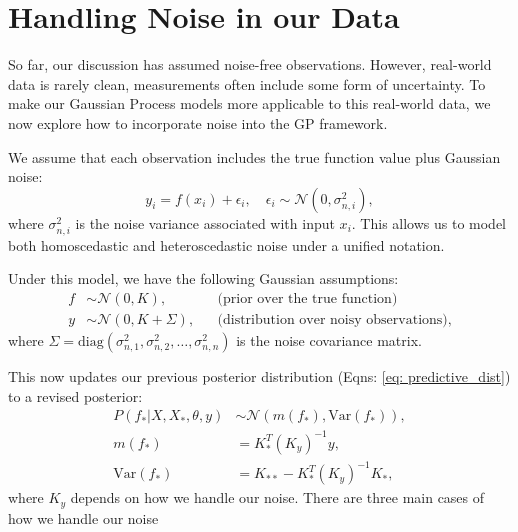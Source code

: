 \documentclass{ucdgradtaughtthesis}
\begin{document}
\section{Handling Noise in our Data}
\label{sec: Handlingnoise}

So far, our discussion has assumed noise-free observations. However, real-world data is rarely clean, measurements often include some form of uncertainty. To make our Gaussian Process models more applicable to this real-world data,
we now explore how to incorporate noise into the GP framework.

\bigskip

\noindent
We assume that each observation includes the true function value plus Gaussian noise:
\begin{equation}
y_i = f(x_i) + \epsilon_i, \quad \epsilon_i \sim \mathcal{N}(0, \sigma_{n,i}^2),
\end{equation}
where \( \sigma_{n,i}^2 \) is the noise variance associated with input \( x_i \). This allows us to model both homoscedastic and heteroscedastic noise under a unified notation.

\bigskip

\noindent
Under this model, we have the following Gaussian assumptions:
\begin{align}
f &\sim \mathcal{N}(0, K), &&\text{(prior over the true function)} \\
y &\sim \mathcal{N}(0, K + \Sigma), &&\text{(distribution over noisy observations)},
\label{eq: prior_distribution_noise}
\end{align}
where \( \Sigma = \mathrm{diag}(\sigma_{n,1}^2, \sigma_{n,2}^2, \dots, \sigma_{n,n}^2) \) is the noise covariance matrix.

\bigskip
\noindent
This now updates our previous posterior distribution (Eqns: \ref{eq: predictive_dist}) to a revised posterior:
%
%
\begin{subequations}
\begin{align}
    P(f_*|X,X_*,\theta,y) &\sim \mathcal{N}(m(f_*), \text{Var}(f_*)),\\
m(f_*) &= K_*^T (K_y)^{-1} y,
\label{eq: predictive_mean_noise}\\
\text{Var}(f_*) &= K_{**} - K_*^T (K_y)^{-1} K_*,
\label{eq: predictive_variance_noise}
\end{align}
\label{eq: predictive_distribution_noise}
\end{subequations}
%
%
where \(K_y\) depends on how we handle our noise. There are three main cases of how we handle our noise
\end{document}
